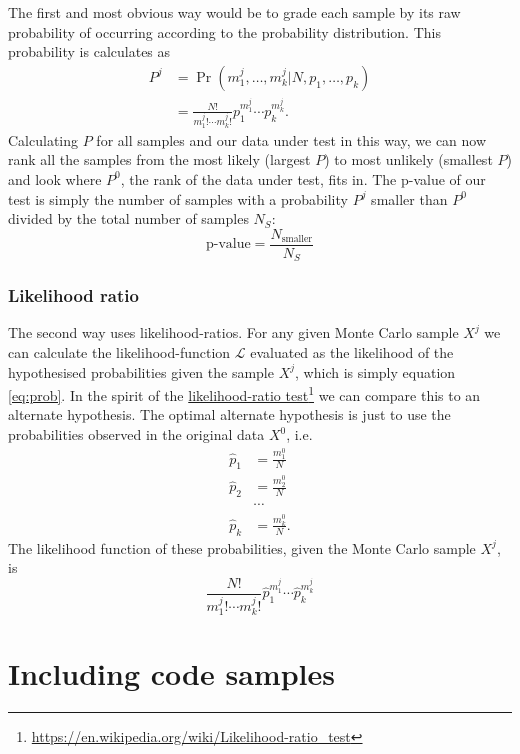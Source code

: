 \documentclass{ol-softwaremanual}
\newcommand{\doclink}[2]{\href{#1}{#2}\footnote{\url{#1}}}
\begin{document}
The first and most obvious way would be to grade each sample by its raw 
probability of occurring according to the probability distribution. This 
probability is calculates as
\begin{align}
P^j &= \Pr\left(m^j_1, \ldots, m^j_k | N , p_1, \ldots, p_k\right) \nonumber \\ 
\label{eq:prob}
&= \frac{N!}{m^j_1! \cdots m^j_k!} p_1^{m^j_1} \cdots p_k^{m^j_k}.
\end{align}
Calculating $P$ for all samples and our data under test in this way, we can 
now rank all the samples from the most likely (largest $P$) to most unlikely 
(smallest $P$) and look where $P^0$, the rank of the data under test, fits in. 
The p-value of our test is simply the number of samples with a probability 
$P^j$ smaller than $P^0$ divided by the total number of samples $N_S$:
\begin{equation}
\textrm{p-value} = \frac{N_{\textrm{smaller}}}{N_S}
\end{equation}


\subsubsection{Likelihood ratio}

The second way uses likelihood-ratios. For any given Monte Carlo sample $X^j$ 
we can calculate the likelihood-function $\mathcal{L}$ evaluated as the 
likelihood of the hypothesised probabilities given the sample $X^j$, which is 
simply equation \eqref{eq:prob}. In the spirit of the 
\doclink{https://en.wikipedia.org/wiki/Likelihood-ratio_test}{likelihood-ratio 
test} we can compare this to an alternate hypothesis. The optimal alternate 
hypothesis is just to use the probabilities observed in the original data 
$X^0$, i.e.
\begin{align*}
\hat{p}_1 &= \frac{m^0_1}{N} \\
\hat{p}_2 &= \frac{m^0_2}{N} \\
& \cdots \\
\hat{p}_k &= \frac{m^0_k}{N}.
\end{align*}
The likelihood function of these probabilities, given the Monte Carlo sample 
$X^j$, is
\begin{equation}
\frac{N!}{m^j_1! \cdots m^j_k!} \hat{p}_1^{m^j_1} \cdots \hat{p}_k^{m^j_k}
\end{equation}


\section{Including code samples}


\end{document}
